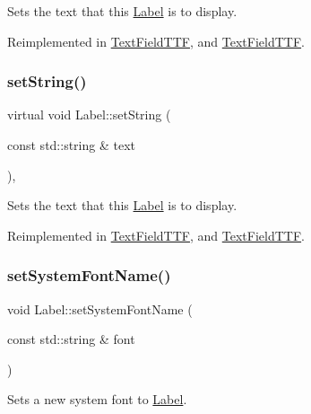 Sets the text that this \hyperlink{classLabel}{Label} is to display. 

Reimplemented in \hyperlink{classTextFieldTTF_a9c8fcddd94799ace845dc808d1246d7b}{Text\+Field\+T\+TF}, and \hyperlink{classTextFieldTTF_a0aee071a7df021d656ace9455e2c0b91}{Text\+Field\+T\+TF}.

\mbox{\label{classLabel_a1fcc854cb77c84193507e085e761a298}} 
\subsubsection{\texorpdfstring{set\+String()}{setString()}\hspace{0.1cm}{\footnotesize\ttfamily [2/2]}}
{\footnotesize\ttfamily virtual void Label\+::set\+String (\begin{DoxyParamCaption}\item[{const std\+::string \&}]{text }\end{DoxyParamCaption})\hspace{0.3cm}{\ttfamily [override]}, {\ttfamily [virtual]}}

Sets the text that this \hyperlink{classLabel}{Label} is to display. 

Reimplemented in \hyperlink{classTextFieldTTF_a9c8fcddd94799ace845dc808d1246d7b}{Text\+Field\+T\+TF}, and \hyperlink{classTextFieldTTF_a0aee071a7df021d656ace9455e2c0b91}{Text\+Field\+T\+TF}.

\mbox{\label{classLabel_a01b4543b4786353e961a1a93599cb97e}} 
\subsubsection{\texorpdfstring{set\+System\+Font\+Name()}{setSystemFontName()}\hspace{0.1cm}{\footnotesize\ttfamily [1/2]}}
{\footnotesize\ttfamily void Label\+::set\+System\+Font\+Name (\begin{DoxyParamCaption}\item[{const std\+::string \&}]{font }\end{DoxyParamCaption})\hspace{0.3cm}{\ttfamily [virtual]}}

Sets a new system font to \hyperlink{classLabel}{Label}.


